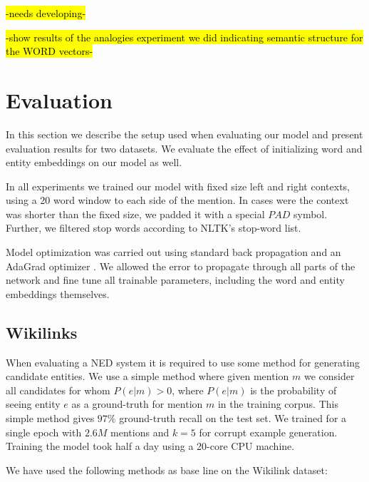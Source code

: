 \documentclass[11pt]{article}
\begin{document}
\hl{-needs developing-}

\hl{-show results of the analogies experiment we did indicating semantic structure for the WORD vectors-}

\section{Evaluation} \label{experiments}

In this section we describe the setup used when evaluating our model and present evaluation results for two datasets. We evaluate the effect of initializing word and entity embeddings on our model as well.

In all experiments we trained our model with fixed size left and right contexts, using a 20 word window to each side of the mention. In cases were the context was shorter than the fixed size, we padded it with a special $PAD$ symbol. Further, we filtered stop words according to NLTK's stop-word list.

Model optimization was carried out using standard back propagation and an AdaGrad optimizer \cite{duchi2011adaptive}. We allowed the error to propagate through all parts of the network and fine tune all trainable parameters, including the word and entity embeddings themselves.

\subsection{Wikilinks}

When evaluating a NED system it is required to use some method for generating candidate entities. We use a simple method where given mention $m$ we consider all candidates for whom $P(e|m)>0$, where $P(e|m)$ is the probability of seeing entity $e$ as a ground-truth for mention $m$ in the training corpus. This simple method gives $97\%$ ground-truth recall on the test set. 
We trained for a single  epoch with $2.6M$ mentions and $k=5$ for corrupt example generation. Training the model took half a day using a 20-core CPU machine.

We have used the following methods as base line on the Wikilink dataset:
\end{document}
